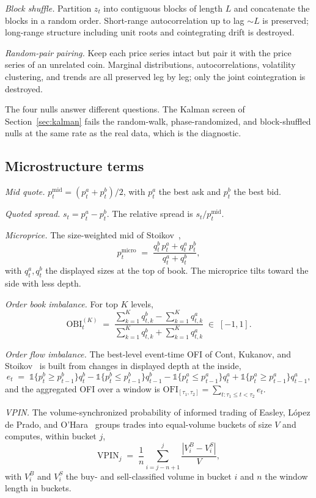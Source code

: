 \documentclass[11pt]{article}
\begin{document}
\emph{Block shuffle.} Partition $z_t$ into contiguous blocks of length $L$ and concatenate
the blocks in a random order. Short-range autocorrelation up to lag $\sim L$ is preserved;
long-range structure including unit roots and cointegrating drift is destroyed.

\emph{Random-pair pairing.} Keep each price series intact but pair it with the price series
of an unrelated coin. Marginal distributions, autocorrelations, volatility clustering, and
trends are all preserved leg by leg; only the joint cointegration is destroyed.

The four nulls answer different questions. The Kalman screen of Section~\ref{sec:kalman}
fails the random-walk, phase-randomized, and block-shuffled nulls at the same rate as the real data,
which is the diagnostic.

\subsection{Microstructure terms}
\label{app:micro}

\emph{Mid quote.} $p^{\mathrm{mid}}_t = (p^a_t + p^b_t)/2$, with $p^a_t$ the best ask and
$p^b_t$ the best bid.

\emph{Quoted spread.} $s_t = p^a_t - p^b_t$. The relative spread is $s_t /
p^{\mathrm{mid}}_t$.

\emph{Microprice.} The size-weighted mid of Stoikov~\cite{stoikov2018microprice},
\[
p^{\mathrm{micro}}_t \;=\; \frac{q^b_t \, p^a_t + q^a_t \, p^b_t}{q^a_t + q^b_t},
\]
with $q^a_t, q^b_t$ the displayed sizes at the top of book. The microprice tilts toward the
side with less depth.

\emph{Order book imbalance.} For top $K$ levels,
\[
\mathrm{OBI}_t^{(K)} \;=\; \frac{\sum_{k=1}^{K} q^b_{t,k} - \sum_{k=1}^{K} q^a_{t,k}}
    {\sum_{k=1}^{K} q^b_{t,k} + \sum_{k=1}^{K} q^a_{t,k}} \;\in\; [-1, 1].
\]

\emph{Order flow imbalance.} The best-level event-time OFI of Cont, Kukanov, and
Stoikov~\cite{contkukanovstoikov2014} is built from changes in displayed depth at the inside,
\[
e_t \;=\; \mathbb{1}\{p^b_t \geq p^b_{t-1}\} q^b_t - \mathbb{1}\{p^b_t \leq p^b_{t-1}\} q^b_{t-1}
    - \mathbb{1}\{p^a_t \leq p^a_{t-1}\} q^a_t + \mathbb{1}\{p^a_t \geq p^a_{t-1}\} q^a_{t-1},
\]
and the aggregated OFI over a window is
$\mathrm{OFI}_{[\tau_1, \tau_2]} = \sum_{t: \tau_1 \leq t < \tau_2} e_t$.

\emph{VPIN.} The volume-synchronized probability of informed trading of Easley, L\'opez de
Prado, and O'Hara~\cite{easley2012vpin} groups trades into equal-volume buckets of size $V$
and computes, within bucket $j$,
\[
\mathrm{VPIN}_j \;=\; \frac{1}{n} \sum_{i=j-n+1}^{j} \frac{|V_i^B - V_i^S|}{V},
\]
with $V_i^B$ and $V_i^S$ the buy- and sell-classified volume in bucket $i$ and $n$ the
window length in buckets.
\end{document}
